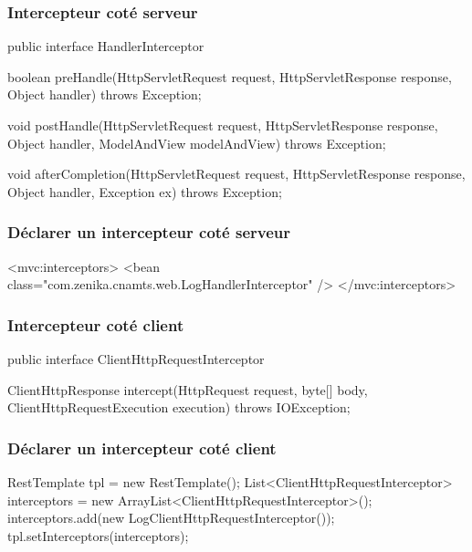 \begin{frame}[fragile]
 \frametitle{Intercepteur coté serveur} 
 
 \begin{javacode}
public interface HandlerInterceptor {
  
  boolean preHandle(HttpServletRequest request, 
                    HttpServletResponse response, 
                    Object handler) throws Exception;

  void postHandle(HttpServletRequest request, 
                  HttpServletResponse response, 
                  Object handler, ModelAndView modelAndView)
             throws Exception;
  
  void afterCompletion(HttpServletRequest request, 
                       HttpServletResponse response, 
                       Object handler, Exception ex)
             throws Exception;

}
 \end{javacode}

\end{frame} 

\begin{frame}[fragile]
 \frametitle{Déclarer un intercepteur coté serveur} 
 
 \begin{xmlcode}
<mvc:interceptors>
  <bean class="com.zenika.cnamts.web.LogHandlerInterceptor" />
</mvc:interceptors>
 \end{xmlcode}

\end{frame} 

\begin{frame}[fragile]
 \frametitle{Intercepteur coté client} 
 
 \begin{javacode}
public interface ClientHttpRequestInterceptor {

  ClientHttpResponse intercept(HttpRequest request, byte[] body, 
                               ClientHttpRequestExecution execution)
                       throws IOException;

}
 \end{javacode}

\end{frame} 

\begin{frame}[fragile]
 \frametitle{Déclarer un intercepteur coté client} 
 
 \begin{javacode}
RestTemplate tpl = new RestTemplate();
List<ClientHttpRequestInterceptor> interceptors = 
  new ArrayList<ClientHttpRequestInterceptor>();
interceptors.add(new LogClientHttpRequestInterceptor());
tpl.setInterceptors(interceptors);
 \end{javacode}

\end{frame} 